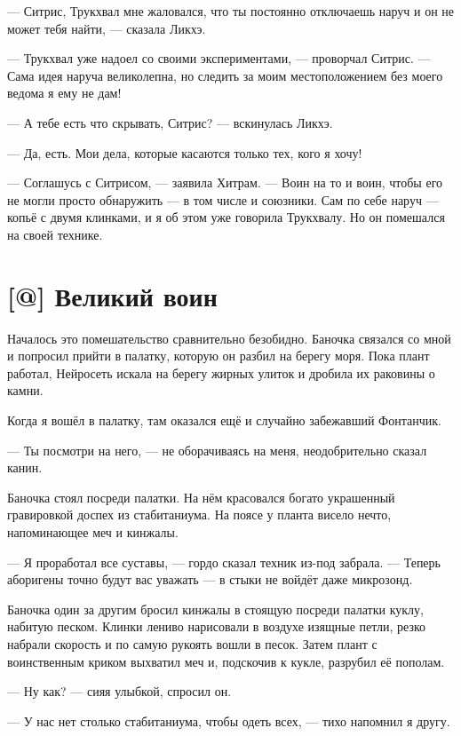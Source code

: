 --- Ситрис, Трукхвал мне жаловался, что ты постоянно отключаешь наруч и он не может тебя найти, --- сказала Ликхэ.

--- Трукхвал уже надоел со своими экспериментами, --- проворчал Ситрис.
--- Сама идея наруча великолепна, но следить за моим местоположением без моего ведома я ему не дам!

--- А тебе есть что скрывать, Ситрис? --- вскинулась Ликхэ.

--- Да, есть.
Мои дела, которые касаются только тех, кого я хочу!

--- Соглашусь с Ситрисом, --- заявила Хитрам.
--- Воин на то и воин, чтобы его не могли просто обнаружить --- в том числе и союзники.
Сам по себе наруч --- копьё с двумя клинками\FM, и я об этом уже говорила Трукхвалу.
Но он помешался на своей технике.

\section{[@] Великий воин}

Началось это помешательство сравнительно безобидно.
Баночка связался со мной и попросил прийти в палатку, которую он разбил на берегу моря.
Пока плант работал, Нейросеть искала на берегу жирных улиток и дробила их раковины о камни.

Когда я вошёл в палатку, там оказался ещё и случайно забежавший Фонтанчик.

--- Ты посмотри на него, --- не оборачиваясь на меня, неодобрительно сказал канин.

Баночка стоял посреди палатки.
На нём красовался богато украшенный гравировкой доспех из стабитаниума.
На поясе у планта висело нечто, напоминающее меч и кинжалы.

--- Я проработал все суставы, --- гордо сказал техник из-под забрала.
--- Теперь аборигены точно будут вас уважать --- в стыки не войдёт даже микрозонд.

Баночка один за другим бросил кинжалы в стоящую посреди палатки куклу, набитую песком.
Клинки лениво нарисовали в воздухе изящные петли, резко набрали скорость и по самую рукоять вошли в песок.
Затем плант с воинственным криком выхватил меч и, подскочив к кукле, разрубил её пополам.

--- Ну как? --- сияя улыбкой, спросил он.

--- У нас нет столько стабитаниума, чтобы одеть всех, --- тихо напомнил я другу.

